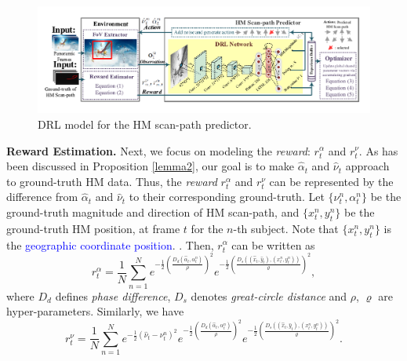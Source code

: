 \documentclass[10pt,journal,compsoc]{IEEEtran}
\begin{document}
\begin{figure}
	\begin{center}
		\centerline{\includegraphics[width=2\columnwidth]{figures/dhp_approach/training_framework}}%
		\caption{\footnotesize{DRL model for the HM scan-path predictor.}}
		\label{train-framework}
	\end{center}
\end{figure}

\textbf{Reward Estimation.}
Next, we focus on modeling the \textit{reward}: $r^{\alpha}_t$ and $r^{\nu}_t$.
As has been discussed in Proposition \ref{lemma2}, our goal is to make $\hat{\alpha}_{t}$ and $\hat{\nu}_{t}$ approach to ground-truth HM data.
Thus, the  \textit{reward} $r^{\alpha}_t$ and $r^{\nu}_t$ can be represented by the difference from $\hat{\alpha}_{t}$ and $\hat{\nu}_{t}$ to their corresponding ground-truth.
Let $\{ \nu^{n}_{t}, \alpha^{n}_{t}\}$ be the ground-truth magnitude and direction of HM scan-path, and $\{x^{n}_{t},y^{n}_{t} \}$ be the ground-truth HM position, at frame $t$ for the $n$-th subject. Note that $\{x^{n}_{t},y^{n}_{t} \}$ is the \textcolor{blue}{geographic coordinate position}. \cite{Goodchild2007}.
Then, $r^{\alpha}_t$ can be written as
\begin{equation}
\label{reward-alpha}
r^{\alpha}_{t} = \frac{1}{N}\sum_{n=1}^{N} e^{-\frac{1}{2}\left(\frac{D_d(\hat{\alpha}_{t}, \alpha^n_{t})}{\rho}\right)^2} e^{-\frac{1}{2}\left(\frac{D_s((\hat{x}_{t},\hat{y}_{t}),(x^n_{t},y^n_{t}))}{\varrho}\right)^2},
\end{equation}
where $D_d$ defines \textit{phase difference}, $D_s$ denotes \textit{great-circle distance} \cite{shumaker1984astronomical} and $\rho$, $\varrho$ are hyper-parameters.
Similarly, we have
\begin{equation}
\label{reward-nu}
r^{\nu}_{t} = \frac{1}{N}\sum_{n=1}^{N}
e^{-\frac{1}{2}\left({\hat{\nu}_{t}-\nu^{n}_{t}}\right)^2} e^{-\frac{1}{2}\left(\frac{D_d(\hat{\alpha}_{t}, \alpha^n_{t})}{\rho}\right)^2} e^{-\frac{1}{2}\left(\frac{D_s((\hat{x}_{t},\hat{y}_{t}),(x^n_{t},y^n_{t}))}{\varrho}\right)^2}.
\end{equation}
\end{document}
